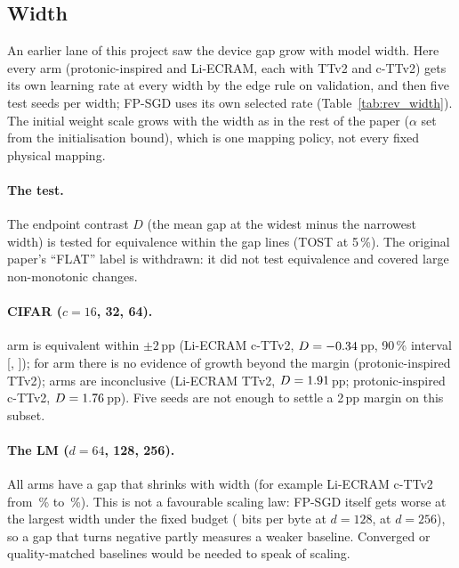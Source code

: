 \subsection{Width}\label{sec:scale}
An earlier lane of this project saw the device gap grow with model width. Here every arm (protonic-inspired and Li-ECRAM, each
with TTv2 and c-TTv2) gets its own learning rate at every width by the edge rule on validation, and then five test seeds per
width; FP-SGD uses its own selected rate (Table~\ref{tab:rev_width}). The initial weight scale grows with the width as in the
rest of the paper ($\alpha$ set from the initialisation bound), which is one mapping policy, not every fixed physical mapping.

\paragraph{The test.} The endpoint contrast $D$ (the mean gap at the widest minus the narrowest width) is tested for
equivalence within the gap lines (TOST at 5\,\%). The original paper's ``FLAT'' label is withdrawn: it did not test equivalence
and covered large non-monotonic changes.

\paragraph{CIFAR ($c=16$, 32, 64).} \RVEFourCifarNEquivalent{} arm is equivalent within $\pm2$\,pp (Li-ECRAM c-TTv2,
$D=-0.34$\,pp, 90\,\% interval [\RVEFourCifarEcramLiTangTwoZeroOneEightCttvTwoLo,
\RVEFourCifarEcramLiTangTwoZeroOneEightCttvTwoHi]); for \RVEFourCifarNNoEvidenceOfGrowthBeyondTheMargin{} arm there is no evidence
of growth beyond the margin (protonic-inspired TTv2); \RVEFourCifarNInconclusive{} arms are inconclusive (Li-ECRAM TTv2,
$D=1.91$\,pp; protonic-inspired c-TTv2, $D=1.76$\,pp).
Five seeds are not enough to settle a 2\,pp margin on this subset.

\paragraph{The LM ($d=64$, 128, 256).} All \RVEFourLmNShrinks{} arms have a gap that shrinks with width (for example Li-ECRAM
c-TTv2 from \RVEFourLmEcramLiTangTwoZeroOneEightCttvTwoWSixFourGap\,\% to \RVEFourLmEcramLiTangTwoZeroOneEightCttvTwoWTwoFiveSixGap\,\%).
This is not a favourable scaling law: FP-SGD itself gets worse at the largest width under the fixed budget
(\RVEFourLmFpWOneTwoEight{} bits per byte at $d=128$, \RVEFourLmFpWTwoFiveSix{} at $d=256$), so a gap that turns negative partly
measures a weaker baseline. Converged or quality-matched baselines would be needed to speak of scaling.


